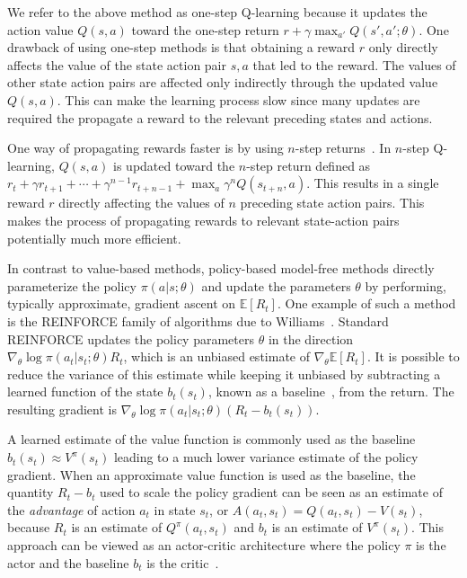 %
%
%
%
%
%

We refer to the above method as one-step Q-learning because it updates the action value $Q(s,a)$ toward the one-step return $r+\gamma \max_{a'}Q(s',a';\theta)$.
%
One drawback of using one-step methods is that obtaining a reward $r$ only directly affects the value of the state action pair $s,a$ that led to the reward.
The values of other state action pairs are affected only indirectly through the updated value $Q(s,a)$.
This can make the learning process slow since many updates are required the propagate a reward to the relevant preceding states and actions.

%
%

One way of propagating rewards faster is by using $n$-step returns~\citep{watkins1989learning,peng1996msq}. In $n$-step Q-learning, $Q(s,a)$ is updated toward the $n$-step return defined as
%
    $r_t + \gamma r_{t+1} + \cdots + \gamma^{n-1} r_{t+n-1} + \max_a \gamma^n Q(s_{t+n}, a)$.
%
This results in a single reward $r$ directly affecting the values of $n$ preceding state action pairs.
This makes the process of propagating rewards to relevant state-action pairs potentially much more efficient.

%
%

In contrast to value-based methods, policy-based model-free methods directly parameterize the policy $\pi(a|s;\theta)$ and update the parameters $\theta$ by performing, typically approximate, gradient ascent on $\mathbb{E}[R_t]$.
One example of such a method is the REINFORCE family of algorithms due to Williams~.
Standard REINFORCE updates the policy parameters $\theta$ in the direction $\nabla_{\theta}\log\pi(a_t|s_t;\theta) R_t$, which is an unbiased estimate of $\nabla_{\theta} \mathbb{E}[R_t]$.
It is possible to reduce the variance of this estimate while keeping it unbiased by subtracting a learned function of the state $b_t(s_t)$, known as a baseline~\citep{Williams1992}, from the return.
The resulting gradient is
%
$\nabla_{\theta}\log\pi(a_t|s_t;\theta) \left(R_t-b_t(s_t)\right)$.
%

A learned estimate of the value function is commonly used as the baseline $b_t(s_t)\approx V^{\pi}(s_t)$ leading to a much lower variance estimate of the policy gradient.
When an approximate value function is used as the baseline, the quantity $R_t-b_t$ used to scale the policy gradient can be seen as an estimate of the \emph{advantage} of action $a_t$ in state $s_t$, or $A(a_t,s_t)=Q(a_t,s_t)-V(s_t)$, because $R_t$ is an estimate of $Q^{\pi}(a_t,s_t)$ and $b_t$ is an estimate of $V^{\pi}(s_t)$.
This approach can be viewed as an actor-critic architecture where the policy $\pi$ is the actor and the baseline $b_t$ is the critic~\citep{sutton:book,degris2012model}.

%

%
%
%
%
%
%
%
%
%
%
%
%

%
%

